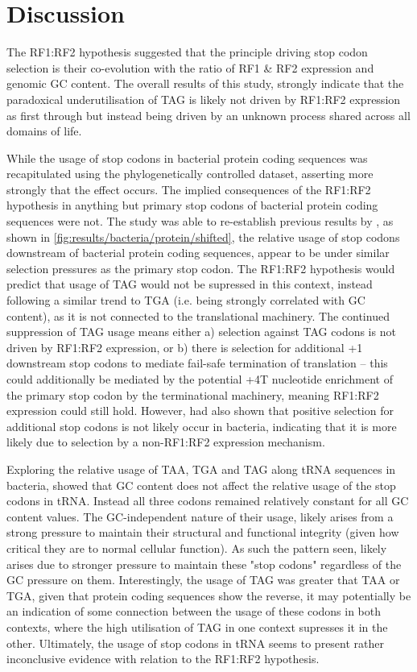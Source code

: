 \documentclass[../main.tex]{subfile}
\begin{document}
 \section{Discussion}
    The RF1:RF2 hypothesis suggested that the principle driving stop codon selection is their co-evolution with the  ratio of RF1 \& RF2 expression and genomic GC content. The overall results of this study, strongly indicate that the paradoxical underutilisation of TAG is likely not driven by RF1:RF2 expression as first through but instead being driven by an unknown process shared across all domains of life.

    While the usage of stop codons in bacterial protein coding sequences was recapitulated using the phylogenetically controlled dataset, asserting more strongly that the effect occurs. The implied consequences of the RF1:RF2 hypothesis in anything but primary stop codons of bacterial protein coding sequences were not.
    The study was able to re-establish previous results by \textcite{Ho2019}, as shown in \cref{fig:results/bacteria/protein/shifted}, the relative usage of stop codons downstream of bacterial protein coding sequences, appear to be under similar selection pressures as the primary stop codon. The RF1:RF2 hypothesis would predict that usage of TAG would not be supressed in this context, instead following a similar trend to TGA (i.e. being strongly correlated with GC content), as it is not connected to the translational machinery.
    The continued suppression of TAG usage means either a) selection against TAG codons is not driven by RF1:RF2 expression, or b) there is selection for additional +1 downstream stop codons to mediate fail-safe termination of translation -- this could additionally be mediated by the potential +4T nucleotide enrichment of the primary stop codon \autocite{Ho2019} by the terminational machinery, meaning RF1:RF2 expression could still hold. However, \textcite{Ho2019} had also shown that positive selection for additional stop codons is not likely occur in bacteria, indicating that it is more likely due to selection by a non-RF1:RF2 expression mechanism.

    Exploring the relative usage of TAA, TGA and TAG along tRNA sequences in bacteria, showed that GC content does not affect the relative usage of the stop codons in tRNA. Instead all three codons remained relatively constant for all GC content values. The GC-independent nature of their usage, likely arises from a strong pressure to maintain their structural and functional integrity (given how critical they are to normal cellular function). As such the pattern seen, likely arises due to stronger pressure to maintain these "stop codons" regardless of the GC pressure on them. Interestingly, the usage of TAG was greater that TAA or TGA, given that protein coding sequences show the reverse, it may potentially be an indication of some connection between the usage of these codons in both contexts, where the high utilisation of TAG in one context supresses it in the other. Ultimately, the usage of stop codons in tRNA seems to present rather inconclusive evidence with relation to the RF1:RF2 hypothesis.
\end{document}
